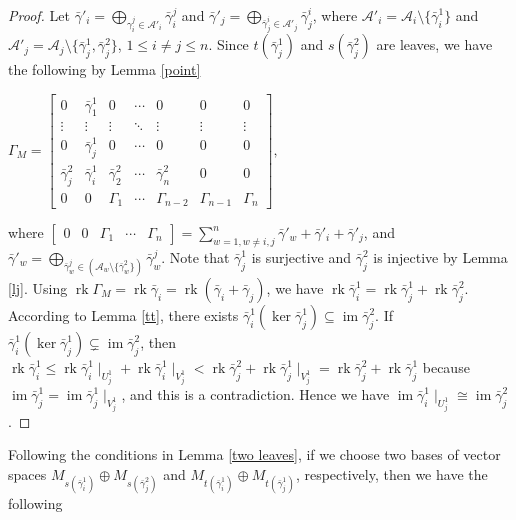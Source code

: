 \documentclass[a4paper,12pt]{amsart}
\newcommand{\cA}{\mathcal{A}}
\newcommand{\bg}{\bar{\gamma}}
\DeclareMathOperator{\rk}{rk}
\DeclareMathOperator{\im}{im}
\begin{document}
\begin{proof}
Let $\bg'_i=\bigoplus_{\gamma^j_i\in \cA'_i}\bg^j_i$ and $\bg'_j=\bigoplus_{\bg^i_j\in \cA'_j}\bg^i_j$, where $\cA'_i=\cA_i\setminus\{\bg^1_i\}$ and $\cA'_j=\cA_j\setminus\{ \bg^1_j, \bg^2_j\}$, $1\leq i\neq j\leq n$. Since    $t(\bg^1_j)$ and $s(\bg^2_j)$ are leaves,     we have the following by Lemma \ref{point}
\begin{center}
$\Gamma_M= \begin{bmatrix}
0 & \bg^1_1 & 0  & \cdots & 0 & 0 & 0\\
\vdots &\vdots & \vdots & \ddots & \vdots & \vdots & \vdots  \\
 0 &\bg^1_j &  0 &  \cdots & 0 & 0 & 0 \\
\bg^2_j &\bg^1_i & \bg^2_2 & \cdots & \bg^2_n  & 0 & 0  \\
0& 0  & \Gamma_1 & \cdots & \Gamma_{n-2} & \Gamma_{n-1} & \Gamma_{n} 
\end{bmatrix}, $
\end{center}
where $\begin{bmatrix}
0 & 0 &\Gamma_1&   \cdots & \Gamma_n  
\end{bmatrix}= \sum^n_{w=1,w\neq i,j} \bg'_w+\bg'_i+\bg'_j$, and $\bg'_w=\bigoplus_{\bg^j_w\in (\cA_w\setminus\{\bg^2_w\})}\bg^j_w$. Note that $\bg^1_j$ is surjective and $\bg^2_j$ is injective by Lemma \ref{lj}. Using $\rk \Gamma_M=\rk \bg_i=\rk(\bg_i+ \bg_j)$, we have $\rk \bg^1_i=\rk \bg^1_j+\rk\bg^2_j$. According to Lemma \ref{tt}, there exists $ \bg^1_i(\ker \bg^1_j)\subseteq \im \bg^2_j$. If $\bg^1_i(\ker \bg^1_j)\subsetneq \im \bg^2_j$, then $\rk \bg^1_i\leq  \rk \bg^1_i\mid_{U^1_j}+\rk \bg^1_i\mid_{V^1_j}<\rk \bg^2_j+\rk \bg^1_j\mid_{V^1_j}=\rk \bg^2_j+\rk\bg^1_j$ because $\im \bg^1_j=\im \bg^1_j\mid_{V^1_j}$, and this is a contradiction. Hence we have $\im \bg^1_i\mid_{U^1_j}\cong \im \bg^2_j$. 

\end{proof}

Following the conditions in Lemma \ref{two leaves},   if we choose two bases of vector spaces $M_{s(\bg^1_i)}\oplus M_{s(\bg^2_j)} $ and $M_{t(\bg^1_i)}\oplus M_{t(\bg^1_j)}$, respectively, then we have the following
\end{document}
